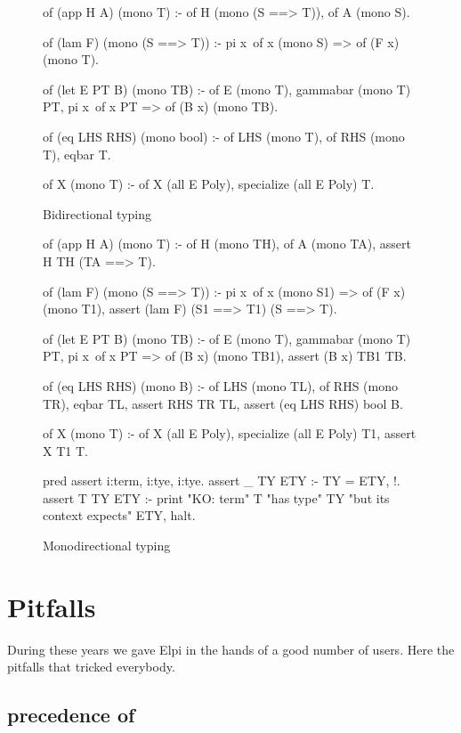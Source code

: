 \documentclass[a4paper, 11pt]{book}
\begin{document}
\begin{figure}
\begin{elpicode}
of (app H A) (mono T) :-
  of H (mono (S ==> T)),
  of A (mono S).

of (lam F) (mono (S ==> T)) :-
  pi x\ of x (mono S) => of (F x) (mono T).

of (let E PT B) (mono TB) :-
  of E (mono T),
  gammabar (mono T) PT,
  pi x\ of x PT => of (B x) (mono TB).

of (eq LHS RHS) (mono bool) :-
  of LHS (mono T),
  of RHS (mono T),
  eqbar T.

of X (mono T) :- of X (all E Poly), specialize (all E Poly) T.
\end{elpicode}
\caption[bidirectional]{Bidirectional typing\label{hm:bidir}}
\end{figure}

\begin{figure}
\begin{elpicode}
of (app H A) (mono T) :-
  of H (mono TH),
  of A (mono TA),
  assert H TH (TA ==> T).

of (lam F) (mono (S ==> T)) :-
  pi x\ of x (mono S1) => of (F x) (mono T1),
  assert (lam F) (S1 ==> T1) (S ==> T).

of (let E PT B) (mono TB) :-
  of E (mono T),
  gammabar (mono T) PT,
  pi x\ of x PT => of (B x) (mono TB1),
  assert (B x) TB1 TB.

of (eq LHS RHS) (mono B) :-
  of LHS (mono TL),
  of RHS (mono TR),
  eqbar TL,
  assert RHS TR TL,
  assert (eq LHS RHS) bool B.

of X (mono T) :- of X (all E Poly), specialize (all E Poly) T1, assert X T1 T.

pred assert i:term, i:tye, i:tye.
assert _ TY ETY :- TY = ETY, !.
assert T TY ETY :-
  print "KO: term" T "has type" TY "but its context expects" ETY, halt.
\end{elpicode}
\caption[monodirectional]{Monodirectional typing\label{hm:mono}}
\end{figure}


\section{Pitfalls}

During these years we gave Elpi in the hands of a
good number of users. Here the pitfalls that tricked everybody.

\subsection{precedence of \elpiinline{=>}}
\end{document}
